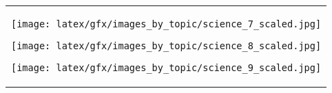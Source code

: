 \begin{table*}[ht]
\begin{tabular}{c}
                    \begin{minipage}{0.08\textwidth}
                        \centering
                        \texttt{[image: latex/gfx/images\_by\_topic/science\_7\_scaled.jpg]}
                    \end{minipage}
                    \begin{minipage}{0.08\textwidth}
                        \centering
                        \texttt{[image: latex/gfx/images\_by\_topic/science\_8\_scaled.jpg]}
                    \end{minipage}
                    \begin{minipage}{0.08\textwidth}
                        \centering
                        \texttt{[image: latex/gfx/images\_by\_topic/science\_9\_scaled.jpg]}
                    \end{minipage}
                \\
    

\end{tabular}
\end{table*}
